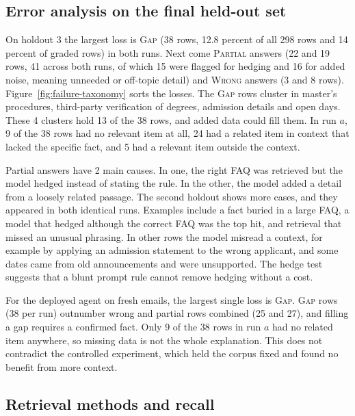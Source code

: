 \subsection{Error analysis on the final held-out set}
\label{sec:live-failures}



On holdout 3 the largest loss is \textsc{Gap} (38 rows, 12.8 percent of all 298 rows and 14 percent of graded rows) in both runs. Next come \textsc{Partial} answers (22 and 19 rows, 41 across both runs, of which 15 were flagged for hedging and 16 for added noise, meaning unneeded or off-topic detail) and \textsc{Wrong} answers (3 and 8 rows). Figure~\ref{fig:failure-taxonomy} sorts the losses. The \textsc{Gap} rows cluster in master's procedures, third-party verification of degrees, admission details and open days. These 4 clusters hold 13 of the 38 rows, and added data could fill them. In run $a$, 9 of the 38 rows had no relevant item at all, 24 had a related item in context that lacked the specific fact, and 5 had a relevant item outside the context.

Partial answers have 2 main causes. In one, the right FAQ was retrieved but the model hedged instead of stating the rule. In the other, the model added a detail from a loosely related passage. The second holdout shows more cases, and they appeared in both identical runs. Examples include a fact buried in a large FAQ, a model that hedged although the correct FAQ was the top hit, and retrieval that missed an unusual phrasing. In other rows the model misread a context, for example by applying an admission statement to the wrong applicant, and some dates came from old announcements and were unsupported. The hedge test suggests that a blunt prompt rule cannot remove hedging without a cost.

For the deployed agent on fresh emails, the largest single loss is \textsc{Gap}. \textsc{Gap} rows (38 per run) outnumber wrong and partial rows combined (25 and 27), and filling a gap requires a confirmed fact. Only 9 of the 38 rows in run $a$ had no related item anywhere, so missing data is not the whole explanation. This does not contradict the controlled experiment, which held the corpus fixed and found no benefit from more context.

\subsection{Retrieval methods and recall}
\label{sec:live-recall}

